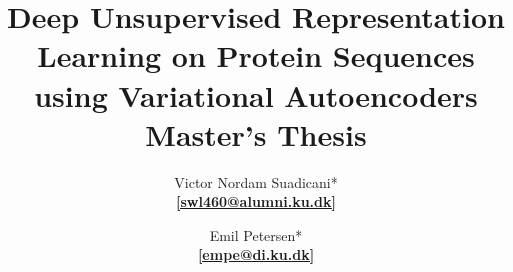 \title{
    \Huge{\textbf{Deep Unsupervised Representation Learning on Protein Sequences using Variational Autoencoders}} \\
    \vspace{1cm}
    \Large{Master's Thesis}
}

\author{{\Large Victor Nordam Suadicani}* \\ \href{mailto:nordam@di.ku.dk}{\textbf{[swl460@alumni.ku.dk]}} \and {\Large Emil Petersen}* \\ \href{mailto:empe@di.ku.dk}{\textbf{[empe@di.ku.dk]}}
}





\maketitle

\thispagestyle{empty}

\newpage
\setcounter{page}{1}
